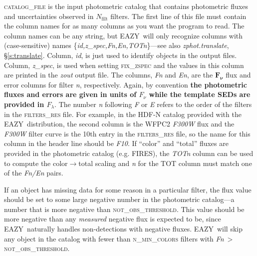\documentclass[11pt]{article}
\newcommand{\eazy}{\textsc{EAZY}}
\begin{document}
\vspace*{0.25cm}\textsc{catalog\_file} is the input photometric catalog that
contains photometric fluxes and uncertainties observed in $N_\mathrm{filt}$
filters.  The first line of this file must contain the column names for as many
columns as you want the program to read.  The column names can be any string,
but \eazy\ will only recognize columns with (case-sensitive) names
\{\textsl{id,z\_spec,Fn,En,TOTn}\}---see also \textit{zphot.translate},
\S\ref{s:translate}.  Column, \textsl{id}, is just used to identify objects in
the output files.  Column, \textsl{z\_spec}, is used when setting
\textsc{fix\_zspec} and the values in this column are printed in the
\textit{zout} output file.  The columns, \textsl{Fn} and \textsl{En}, are the
$\mathbf{F_\nu}$ flux and error columns for filter \textsl{n}, respectively. 
Again, by convention \textbf{the photometric fluxes and errors are given in
units of $F_\nu$ while the template SEDs are provided in $F_\lambda$}.  The
number \textsl{n} following \textsl{F} or \textsl{E} refers to the order of the
filters in the \textsc{filters\_res} file.  For example, in the HDF-N catalog
provided with the \eazy\ distribution, the second column is the WFPC2
\textsl{F300W} flux and the \textsl{F300W} filter curve is the 10th entry in
the \textsc{filters\_res} file, so the name for this column in the header line
should be \textsl{F10}.  If ``color'' and ``total'' fluxes are provided in the
photometric catalog (e.g. FIRES), the \textsl{TOTn} column can be used to
compute the color$\rightarrow$total scaling and \textsl{n} for the TOT column
must match one of the \textsl{Fn/En} pairs.

If an object has missing data for some reason in a particular filter, the flux
value should be set to some large negative number in the photometric
catalog---a number that is more negative than \textsc{not\_obs\_threshold}. 
This value should be more negative than any \textit{measured} negative flux is
expected to be, since \eazy\ naturally handles non-detections with negative
fluxes.  \eazy\ will skip any object in the catalog with fewer than
\textsc{n\_min\_colors} filters with \textsl{Fn}$\ >\
$\textsc{not\_obs\_threshold}.
\end{document}
